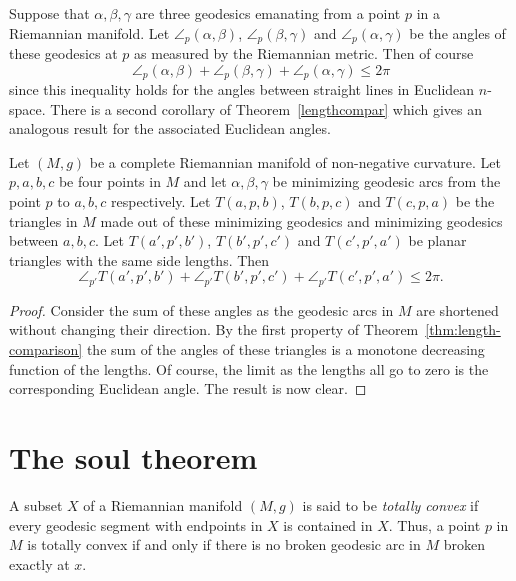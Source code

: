 Suppose that $\alpha, \beta,\gamma$ are three geodesics
emanating from a point $p$ in a Riemannian manifold. Let $\angle_p
(\alpha,\beta)$, $\angle_p(\beta,\gamma)$ and
$\angle_p(\alpha,\gamma)$ be the angles of these geodesics at $p$ as
measured by the Riemannian metric. Then of course
$$\angle_p(\alpha,\beta)+\angle_p(\beta,\gamma)+\angle_p(\alpha,\gamma)\le
2\pi$$ since this inequality holds for the angles between straight
lines in Euclidean $n$-space. There is a second corollary of
Theorem~\ref{lengthcompar} which gives an analogous result for the
associated Euclidean angles.



\begin{corollary}
\label{cor:angle-comparison}
\label{anglecompar}
Let $(M,g)$ be a complete Riemannian manifold of non-negative
curvature. Let $p,a,b,c$ be four points in $M$ and let
$\alpha,\beta,\gamma$ be minimizing geodesic arcs from the point
$p$ to $a,b,c$ respectively. Let $T(a,p,b)$, $T(b,p,c)$ and
$T(c,p,a)$ be the triangles in $M$ made out of these minimizing
geodesics and minimizing geodesics between $a,b,c$. Let
$T(a',p',b')$, $T(b',p',c')$ and $T(c',p',a')$ be planar triangles
with the same side lengths. Then
$$\angle_{p'}T(a',p',b')+\angle_{p'}T(b',p',c')+\angle_{p'}T(c',p',a')\le 2\pi.$$
\end{corollary}

\begin{proof}
Consider the sum of these angles as the geodesic arcs in $M$ are
shortened without changing their direction. By the first property of
Theorem~\ref{thm:length-comparison} the sum of the angles of these triangles
is a monotone decreasing function of the lengths. Of course, the
limit as the lengths all go to zero is the corresponding Euclidean
angle. The result is now clear.
\end{proof}



\section{The soul theorem}

A subset $X$ of a Riemannian manifold $(M,g)$ is said to be {\em
totally convex} if every geodesic segment with endpoints in $X$ is
contained in $X$. Thus, a point $p$ in $M$ is totally convex if and
only if there is no broken geodesic arc in $M$ broken exactly at
$x$.


